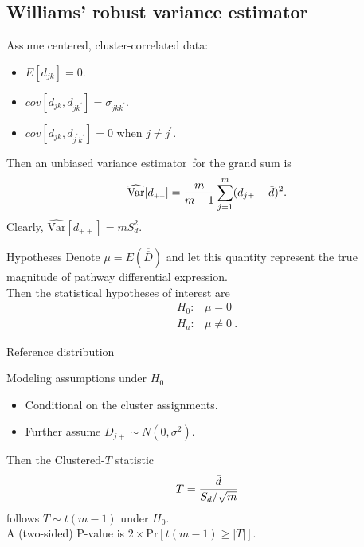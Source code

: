 \documentclass[a0,portrait]{a0poster}
\newcommand*{\barbar}[1]{\overline{\overline{#1}}}
\newcommand{\overbar}[1]{\mkern 3mu\overline{\mkern-3mu#1\mkern-1.mu}\mkern 1.mu}
\begin{document}
\begin{multicols}{3}

\subsection*{Williams' robust variance estimator\cite{Williams2000}}

Assume centered, cluster-correlated data:

\begin{itemize}
  
\item{$E[d_{jk}]=0$}.
  
\item{$cov[d_{jk},d_{jk^{\prime}}]=\sigma_{jkk^{\prime}}$}.
  
\item{$cov[d_{jk},d_{j^{\prime}k^{\prime}}]=0$ when $j\neq j^{\prime}$}.
  
\end{itemize}

Then an unbiased variance estimator\footnotemark~for the grand sum is
\begin{equation*}
\label{eq:var}
\widehat{\text{Var}}[d_{\scriptscriptstyle{++}}] = \frac{m}{m-1}\sum_{j=1}^m(d_{j+} - \overbar{d})^2.
\end{equation*}
\centering Clearly, $\widehat{\text{Var}}[d_{\scriptscriptstyle{++}}] = mS_d^2$.


Hypotheses
  Denote $\mu = E\left(\barbar{D}\right)$ and let this quantity represent the true magnitude of pathway differential expression.\\
  \vskip6pt
  {Then the statistical hypotheses of interest are}
    \begin{equation*}
      \label{eq:hypotheses}
      \begin{array}{rl}
        H_{0}: & \mu = 0 \\
        H_{a}: & \mu \neq 0 \ .
      \end{array}
    \end{equation*}


Reference distribution
  
      Modeling assumptions under $H_0$
        \begin{itemize}
        \item{Conditional on the cluster assignments.}
        \item{Further assume $D_{j\scriptscriptstyle{+}} \sim N(0, \sigma^2)$.}
        \end{itemize}
      Then the Clustered-$T$ statistic{\footnotemark}
\begin{equation*}
  \label{eq:tstat}
T =  \frac{\overbar{d}}{S_d/\sqrt{m}}
\end{equation*}
follows $T \sim t(m-1)$ under $H_0$. \\
A (two-sided) P-value is $2\times\text{Pr}[t(m-1) \ge |T|]$.


\end{multicols}
\end{document}
